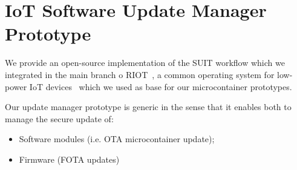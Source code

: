 \documentclass[../main.tex]{subfiles}
\begin{document}
	
\section{IoT Software Update Manager Prototype}

We provide an open-source implementation of the SUIT workflow which we integrated in the main branch o RIOT~\cite{RIOT-suit}, a common operating system for low-power IoT devices~\cite{baccelli2018riot} which we used as base for our  microcontainer prototypes.

Our update manager prototype is generic in the sense that it enables both to manage the secure update of:
\begin{itemize}
    \item Software modules (i.e. OTA microcontainer update);
    \item Firmware (FOTA updates)
\end{itemize}
	
\end{document}
